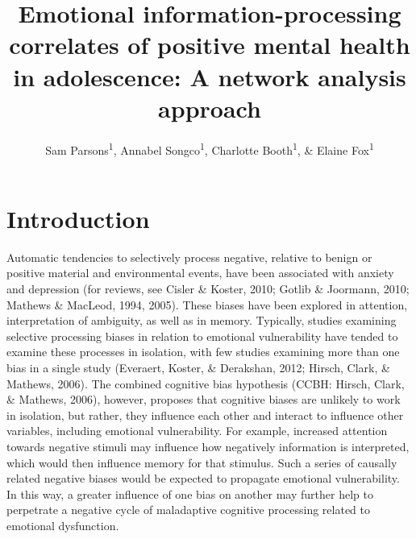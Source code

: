 \documentclass[
  english,
  man]{apa6}
\title{Emotional information-processing correlates of positive mental health in adolescence: A network analysis approach}
\author{Sam Parsons\textsuperscript{1}, Annabel Songco\textsuperscript{1}, Charlotte Booth\textsuperscript{1}, \& Elaine Fox\textsuperscript{1}}
\date{}
\affiliation{\vspace{0.5cm}\textsuperscript{1} Department of Experimental Psychology, University of Oxford}
\begin{document}
\maketitle

\hypertarget{introduction}{%
\section{Introduction}\label{introduction}}

Automatic tendencies to selectively process negative, relative to benign or positive material and environmental events, have been associated with anxiety and depression (for reviews, see Cisler \& Koster, 2010; Gotlib \& Joormann, 2010; Mathews \& MacLeod, 1994, 2005). These biases have been explored in attention, interpretation of ambiguity, as well as in memory. Typically, studies examining selective processing biases in relation to emotional vulnerability have tended to examine these processes in isolation, with few studies examining more than one bias in a single study (Everaert, Koster, \& Derakshan, 2012; Hirsch, Clark, \& Mathews, 2006). The combined cognitive bias hypothesis (CCBH: Hirsch, Clark, \& Mathews, 2006), however, proposes that cognitive biases are unlikely to work in isolation, but rather, they influence each other and interact to influence other variables, including emotional vulnerability. For example, increased attention towards negative stimuli may influence how negatively information is interpreted, which would then influence memory for that stimulus. Such a series of causally related negative biases would be expected to propagate emotional vulnerability. In this way, a greater influence of one bias on another may further help to perpetrate a negative cycle of maladaptive cognitive processing related to emotional dysfunction.
\end{document}

